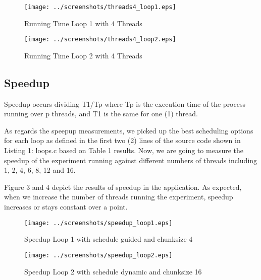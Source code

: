 \documentclass[12pt,a4paper]{article}
\newcommand{\sectionVspacing}{\vspace{15pt}}
\begin{document}
\begin{figure}[ht]
	\centering
	\texttt{[image: ../screenshots/threads4\_loop1.eps]}
	\caption{Running Time Loop 1 with 4 Threads}
	\label{loop1-threads4}
\end{figure}

\begin{figure}[ht]
	\centering
	\texttt{[image: ../screenshots/threads4\_loop2.eps]}
	\caption{Running Time Loop 2 with 4 Threads}
	\label{loop2-threads4}
\end{figure}

\clearpage

\subsection{Speedup}
Speedup occurs dividing T1/Tp where Tp is the execution time of the process running over p threads, and T1 is the same for one (1) thread.

As regards the speepup measurements, we picked up the best scheduling options for each loop as defined in the first two (2) lines of the source code shown in Listing 1: loops.c based on Table 1 results. Now, we are going to measure the speedup of the experiment running against different numbers of threads including 1, 2, 4, 6, 8, 12 and 16.



Figure 3 and 4 depict the results of speedup in the application. As expected, when we increase the number of threads running the experiment, speedup increases or stays constant over a point.

\begin{figure}[h]
	\centering
	\texttt{[image: ../screenshots/speedup\_loop1.eps]}
	\caption{Speedup Loop 1 with schedule guided and chunksize 4}
	\label{Speedup-Loop1}
\end{figure}

\begin{figure}[ht]
	\centering
	\texttt{[image: ../screenshots/speedup\_loop2.eps]}
	\caption{Speedup Loop 2 with schedule dynamic and chunksize 16}
	\label{Speedup-Loop2}
\end{figure}

\clearpage



\sectionVspacing


\end{document}
